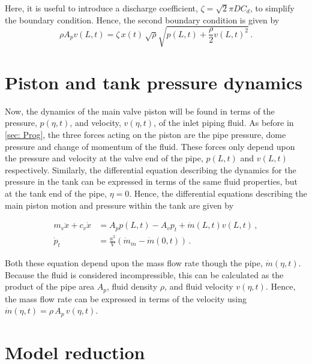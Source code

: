 Here, it is useful to introduce a discharge coefficient, $\zeta = \sqrt{2} \pi D C_d$, to simplify the boundary condition. Hence, the second boundary condition is given by
~
\begin{equation} \label{eq: QWMBoundary2}
    \rho A_p v(L,t) = \zeta \, x(t) \, \sqrt{\rho} \sqrt{ p(L,t) + \frac{\rho}{2} v(L,t)^2 } \, .
\end{equation}

\section{Piston and tank pressure dynamics} \label{subsec: PistonTankDyn}

Now, the dynamics of the main valve piston will be found in terms of the pressure, $p(\eta,t)$, and velocity, $v(\eta,t)$, of the inlet piping fluid. As before in \cref{sec: Prog}, the three forces acting on the piston are the pipe pressure, dome pressure and change of momentum of the fluid. These forces only depend upon the pressure and velocity at the valve end of the pipe, $p(L,t)$ and $v(L,t)$ respectively. Similarly, the differential equation describing the dynamics for the pressure in the tank can be expressed in terms of the same fluid properties, but at the tank end of the pipe, $\eta = 0$. Hence, the differential equations describing the main piston motion and pressure within the tank are given by

\begin{equation} \label{eq: ValveODEsPipe}
\begin{split}
    m_v \ddot{x} + c_v \dot{x} &= A_p p(L,t) - A_v p_t + \dot{m}(L,t)
    v(L,t) %
    \, , \\
    \dot{p}_t &= \frac{a^2}{V} \left( \dot{m}_{in} - \dot{m}(0,t) \right) \, .
\end{split}
\end{equation}

Both these equation depend upon the mass flow rate though the pipe, $\dot{m}(\eta,t)$. Because the fluid is considered incompressible, this can be calculated as the product of the pipe area $A_p$, fluid density $\rho$, and fluid velocity $v(\eta,t)$. Hence, the mass flow rate can be expressed in terms of the velocity using $\dot{m}(\eta,t) = \rho \, A_p \, v(\eta,t)$.

\section{Model reduction}

